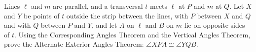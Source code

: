 Lines $\ell$ and $m$ are parallel, and a transversal $t$ meets $\ell$ at $P$ and $m$ at $Q$. Let $X$ and $Y$ be points of $t$ outside the strip between the lines, with $P$ between $X$ and $Q$ and with $Q$ between $P$ and $Y$, and let $A$ on $\ell$ and $B$ on $m$ lie on opposite sides of $t$. Using the Corresponding Angles Theorem and the Vertical Angles Theorem, prove the Alternate Exterior Angles Theorem: $\angle XPA\cong\angle YQB$.
